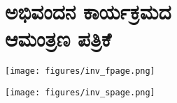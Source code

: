 {\fontsize{14}{16}\selectfont
\chapter{ಅಭಿವಂದನ ಕಾರ್ಯಕ್ರಮದ\\ ಆಮಂತ್ರಣ ಪತ್ರಿಕೆ}

\centerline{\texttt{[image: figures/inv\_fpage.png]}}
\medskip

\centerline{\texttt{[image: figures/inv\_spage.png]}}
}
